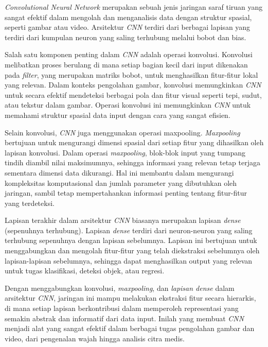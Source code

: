 \textit{Convolutional Neural Network} merupakan sebuah jenis jaringan saraf tiruan yang sangat efektif dalam mengolah dan menganalisis data dengan struktur spasial, seperti gambar atau video. Arsitektur \textit{CNN} terdiri dari berbagai lapisan yang terdiri dari kumpulan neuron yang saling terhubung melalui bobot dan bias. \cite{wu2017introduction}

Salah satu komponen penting dalam \textit{CNN} adalah operasi konvolusi. Konvolusi melibatkan proses berulang di mana setiap bagian kecil dari input dikenakan pada \textit{filter}, yang merupakan matriks bobot, untuk menghasilkan fitur-fitur lokal yang relevan. Dalam konteks pengolahan gambar, konvolusi memungkinkan \textit{CNN} untuk secara efektif mendeteksi berbagai pola dan fitur visual seperti tepi, sudut, atau tekstur dalam gambar. Operasi konvolusi ini memungkinkan \textit{CNN} untuk memahami struktur spasial data input dengan cara yang sangat efisien.\cite{koushik2016understanding}

Selain konvolusi, \textit{CNN} juga menggunakan operasi maxpooling. \textit{Maxpooling} bertujuan untuk mengurangi dimensi spasial dari setiap fitur yang dihasilkan oleh lapisan konvolusi. Dalam operasi \textit{maxpooling}, blok-blok input yang tumpang tindih diambil nilai maksimumnya, sehingga informasi yang relevan tetap terjaga sementara dimensi data dikurangi. Hal ini membantu dalam mengurangi kompleksitas komputasional dan jumlah parameter yang dibutuhkan oleh jaringan, sambil tetap mempertahankan informasi penting tentang fitur-fitur yang terdeteksi.

Lapisan terakhir dalam arsitektur \textit{CNN} biasanya merupakan lapisan \textit{dense} (sepenuhnya terhubung). Lapisan \textit{dense} terdiri dari neuron-neuron yang saling terhubung sepenuhnya dengan lapisan sebelumnya. Lapisan ini bertujuan untuk menggabungkan dan mengolah fitur-fitur yang telah diekstraksi sebelumnya oleh lapisan-lapisan sebelumnya, sehingga dapat menghasilkan output yang relevan untuk tugas klasifikasi, deteksi objek, atau regresi.

Dengan menggabungkan konvolusi, \textit{maxpooling}, dan \textit{lapisan dense} dalam arsitektur \textit{CNN}, jaringan ini mampu melakukan ekstraksi fitur secara hierarkis, di mana setiap lapisan berkontribusi dalam memperoleh representasi yang semakin abstrak dan informatif dari data input. Inilah yang membuat \textit{CNN} menjadi alat yang sangat efektif dalam berbagai tugas pengolahan gambar dan video, dari pengenalan wajah hingga analisis citra medis.

